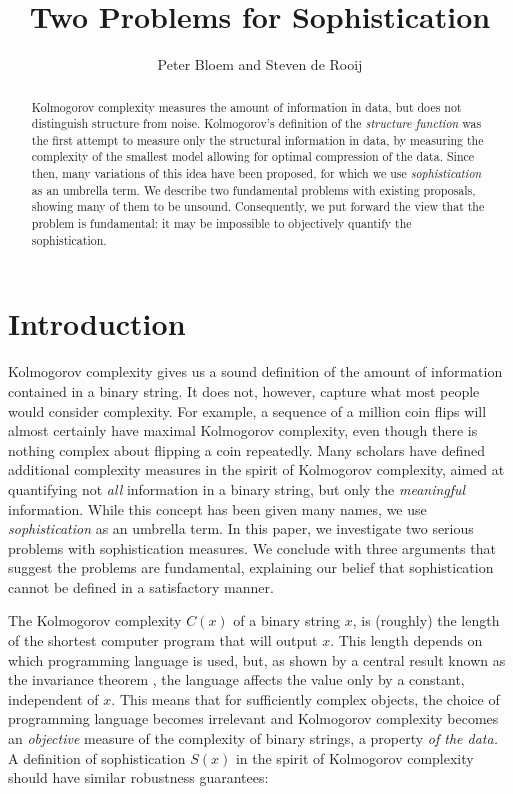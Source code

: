 \documentclass{style/llncs}
\title{Two Problems for Sophistication}
\author{Peter Bloem and Steven de Rooij}
\institute{
  System and Network Engineering Group, \\University of Amsterdam, the Netherlands\\
  \email{uva@peterbloem.nl, steven.de.rooij@gmail.com}
}
\begin{document}
 
\maketitle

\begin{abstract}
Kolmogorov complexity measures the amount of information in data, but does not distinguish structure from noise. Kolmogorov's definition of the \emph{structure function} was the first attempt to measure only the structural information in data, by measuring the complexity of the smallest model allowing for optimal compression of the data. Since then, many variations of this idea have been proposed, for which we use \emph{sophistication} as an umbrella term. We describe two fundamental problems with existing proposals, showing many of them to be unsound. Consequently, we put forward the view that the problem is fundamental: it may be impossible to objectively quantify the sophistication.
\end{abstract}

\section{Introduction}

Kolmogorov complexity gives us a sound definition of the amount of information contained in a binary string. It does not, however, capture what most people would consider complexity. For example, a sequence of a million coin flips will almost certainly have maximal Kolmogorov complexity, even though there is nothing complex about flipping a coin repeatedly. Many scholars have defined additional complexity measures in the spirit of Kolmogorov complexity, aimed at quantifying not \emph{all} information in a binary string, but only the \emph{meaningful} information. While this concept has been given many names, we use \emph{sophistication} as an umbrella term. In this paper, we investigate two serious problems with sophistication measures. We conclude with three arguments that suggest the problems are fundamental, explaining our belief that sophistication cannot be defined in a satisfactory manner.

The Kolmogorov complexity $C(x)$ of a binary string $x$, is (roughly) the length of the shortest computer program that will output $x$. This length depends on which programming language is used, but, as shown by a central result known as the invariance theorem \cite[Section~2.1]{li1993introduction}, the language affects the value only by a constant, independent of $x$. This means that for sufficiently complex objects, the choice of programming language becomes irrelevant and Kolmogorov complexity becomes an \emph{objective} measure of the complexity of binary strings, a property \emph{of the data.} A definition of sophistication $S(x)$ in the spirit of Kolmogorov complexity should have similar robustness guarantees:
\end{document}
